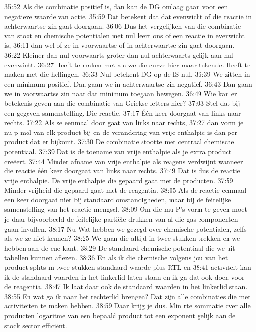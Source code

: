35:52
Als die combinatie positief is, dan kan de DG omlaag gaan voor een negatieve waarde van actie.
35:59
Dat betekent dat dat evenwicht of die reactie in achterwaartse zin gaat doorgaan.
36:06
Dus het vergelijken van die combinatie van stoot en chemische potentialen met nul leert ons of een reactie in evenwicht is,
36:11
dan wel of ze in voorwaartse of in achterwaartse zin gaat doorgaan.
36:22
Kleiner dan nul voorwaarts groter dan nul achterwaarts gelijk aan nul evenwicht.
36:27
Heeft te maken met als we die curve hier maar tekende. Heeft te maken met die hellingen.
36:33
Nul betekent DG op de IS nul.
36:39
We zitten in een minimum positief. Dan gaan we in achterwaartse zin negatief.
36:43
Dan gaan we in voorwaartse zin naar dat minimum toegaan bewegen.
36:49
Wie kan er betekenis geven aan die combinatie van Griekse letters hier?
37:03
Stel dat bij een gegeven samenstelling. Die reactie.
37:17
Één keer doorgaat van links naar rechts.
37:22
Als ze eenmaal door gaat van links naar rechts,
37:27
dan vorm je nu p mol van elk product bij en de verandering van vrije enthalpie is dan per product dat er bijkomt.
37:30
De combinatie stootte met centraal chemische potentiaal.
37:39
Dat is de toename van vrije enthalpie als je extra product creëert.
37:44
Minder afname van vrije enthalpie als reagens verdwijnt wanneer die reactie één keer doorgaat van links naar rechts.
37:49
Dat is dus de reactie vrije enthalpie. De vrije enthalpie die gepaard gaat met de producten.
37:59
Minder vrijheid die gepaard gaat met de reagentia.
38:05
Als de reactie eenmaal een keer doorgaat niet bij standaard omstandigheden, maar bij de feitelijke samenstelling van het reactie mengsel.
38:09
Om die mu P's vorm te geven moet je daar bijvoorbeeld de feitelijke partiële drukken van al die gas componenten gaan invullen.
38:17
Nu Wat hebben we gezegd over chemische potentialen, zelfs als we ze niet kennen?
38:25
We gaan die altijd in twee stukken trekken en we hebben aan de ene kant.
38:29
De standaard chemische potentiaal die we uit tabellen kunnen aflezen.
38:36
En als ik die chemische volgens jou van het product splits in twee stukken standaard waarde plus RTL en
38:41
activiteit kan ik de standaard waarden in het linkerlid laten staan en ik ga dat ook doen voor de reagentia.
38:47
Ik laat daar ook de standaard waarden in het linkerlid staan.
38:55
En wat ga ik naar het rechterlid brengen? Dat zijn alle combinaties die met activiteiten te maken hebben.
38:59
Daar krijg je dus. Min rte sommatie over alle producten logaritme van een bepaald product tot een exponent gelijk aan de stock sector efficiënt.
